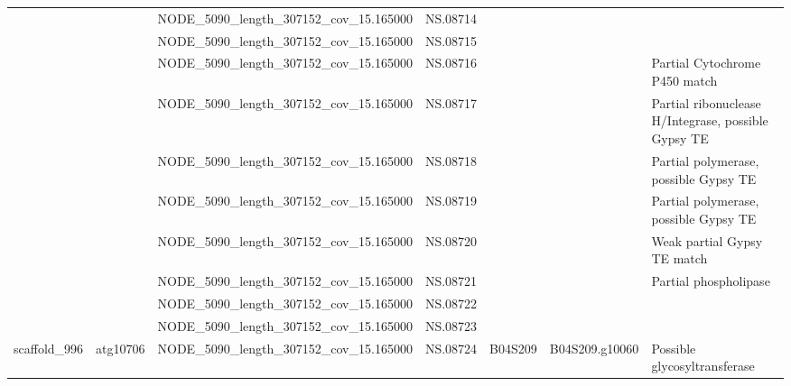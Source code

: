 \begin{longtable}{lllllll}
                &           &   NODE\_5090\_length\_307152\_cov\_15.165000 &              NS.08714 &              &                 &                                                                                 \\
                &           &   NODE\_5090\_length\_307152\_cov\_15.165000 &              NS.08715 &              &                 &                                                                                 \\
                &           &   NODE\_5090\_length\_307152\_cov\_15.165000 &              NS.08716 &              &                 &                                                   Partial Cytochrome P450 match \\
                &           &   NODE\_5090\_length\_307152\_cov\_15.165000 &              NS.08717 &              &                 &                             Partial ribonuclease H/Integrase, possible Gypsy TE \\
                &           &   NODE\_5090\_length\_307152\_cov\_15.165000 &              NS.08718 &              &                 &                                           Partial polymerase, possible Gypsy TE \\
                &           &   NODE\_5090\_length\_307152\_cov\_15.165000 &              NS.08719 &              &                 &                                           Partial polymerase, possible Gypsy TE \\
                &           &   NODE\_5090\_length\_307152\_cov\_15.165000 &              NS.08720 &              &                 &                                                     Weak partial Gypsy TE match \\
                &           &   NODE\_5090\_length\_307152\_cov\_15.165000 &              NS.08721 &              &                 &                                                           Partial phospholipase \\
                &           &   NODE\_5090\_length\_307152\_cov\_15.165000 &              NS.08722 &              &                 &                                                                                 \\
                &           &   NODE\_5090\_length\_307152\_cov\_15.165000 &              NS.08723 &              &                 &                                                                                 \\
   scaffold\_996 &  atg10706 &   NODE\_5090\_length\_307152\_cov\_15.165000 &              NS.08724 &      B04S209 &  B04S209.g10060 &                                                    Possible glycosyltransferase \\

\end{longtable}
